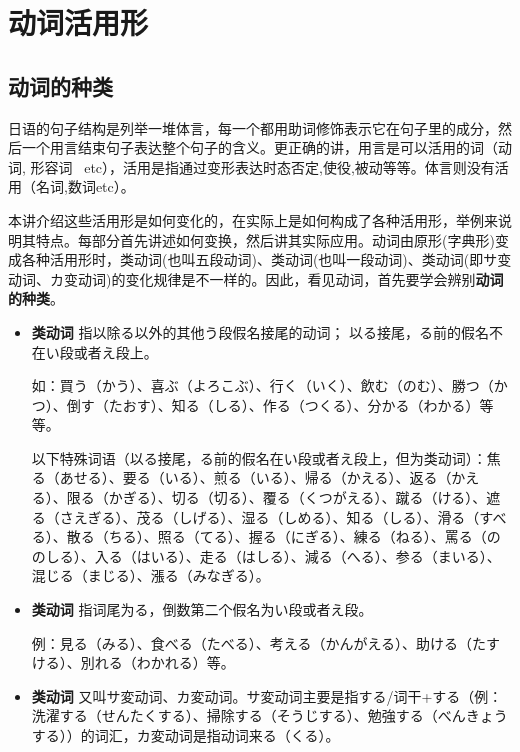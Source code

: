 \section{动词活用形}

\subsection*{动词的种类}

日语的句子结构是列举一堆体言，每一个都用助词修饰表示它在句子里的成分，然后一个用言结束句子表达整个句子的含义。更正确的讲，用言是可以活用的词（动词, 形容词 \, etc），活用是指通过变形表达时态否定,使役,被动等等。体言则没有活用（名词,数词etc）。

本讲介绍这些活用形是如何变化的，在实际上是如何构成了各种活用形，举例来说明其特点。每部分首先讲述如何变换，然后讲其实际应用。动词由原形(字典形)变成各种活用形时，\I 类动词(也叫五段动词)、\II 类动词(也叫一段动词)、\III 类动词(即サ变动词、カ变动词)的变化规律是不一样的。因此，看见动词，首先要学会辨别{\bfseries 动词的种类}。

\begin{itemize}
    \item {\bfseries \I 类动词} 指以除る以外的其他う段假名接尾的动词； 以る接尾，る前的假名不在い段或者え段上。
    
    如：買う（かう）、喜ぶ（よろこぶ）、行く（いく）、飲む（のむ）、勝つ（かつ）、倒す（たおす）、知る（しる）、作る（つくる）、分かる（わかる）等等。

    以下特殊词语（以る接尾，る前的假名在い段或者え段上，但为{\I 类动词}）：焦る（あせる）、要る（いる）、煎る（いる）、帰る（かえる）、返る（かえる）、限る（かぎる）、切る（切る）、覆る（くつがえる）、蹴る（ける）、遮る（さえぎる）、茂る（しげる）、湿る（しめる）、知る（しる）、滑る（すべる）、散る（ちる）、照る（てる）、握る（にぎる）、練る（ねる）、罵る（ののしる）、入る（はいる）、走る（はしる）、減る（へる）、参る（まいる）、混じる（まじる）、漲る（みなぎる）。
    \vspace{0.2in}
    \item {\bfseries \II 类动词} 指词尾为る，倒数第二个假名为い段或者え段。
    
    例：見る（みる）、食べる（たべる）、考える（かんがえる）、助ける（たすける）、別れる（わかれる）等。
    \vspace{0.2in}
    \item {\bfseries \III 类动词} 又叫サ変动词、カ変动词。サ変动词主要是指する/词干+する（例：洗濯する（せんたくする）、掃除する（そうじする）、勉強する（べんきょうする））的词汇，カ変动词是指动词来る（くる）。
    
\end{itemize}


